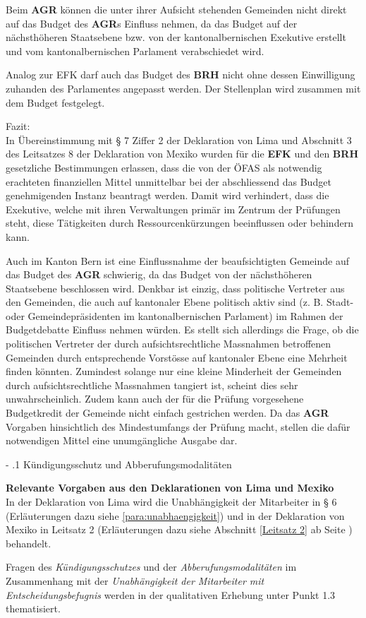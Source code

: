 \documentclass[10pt]{article}
\makeatletter
\renewcommand\paragraph{\@startsection{paragraph}{3}{0mm}{-\baselineskip}{.1\baselineskip}{\normalfont\normalsize\bfseries}}
\renewcommand\paragraph{%
\@startsection{paragraph}{3}{0mm}%
{-\baselineskip}%
{.1\baselineskip}%
{\normalfont\normalsize\bfseries}}
\makeatother
\begin{document}
Beim \textbf{AGR} können die unter ihrer Aufsicht stehenden Gemeinden nicht direkt auf das Budget des \textbf{AGR}s Einfluss nehmen, da das Budget auf der nächsthöheren Staatsebene bzw. von der kantonalbernischen Exekutive erstellt und vom kantonalbernischen Parlament verabschiedet wird.

Analog zur EFK darf auch das Budget des \textbf{BRH} nicht ohne dessen Einwilligung zuhanden des Parlamentes angepasst werden. Der Stellenplan wird zusammen mit dem Budget festgelegt.

Fazit:\\
In Übereinstimmung mit § 7 Ziffer 2 der Deklaration von Lima und Abschnitt 3 des Leitsatzes 8 der Deklaration von Mexiko wurden für die \textbf{EFK} und den \textbf{BRH} gesetzliche Bestimmungen erlassen, dass die von der ÖFAS als notwendig erachteten finanziellen Mittel unmittelbar bei der abschliessend das Budget genehmigenden Instanz beantragt werden. Damit wird verhindert, dass die Exekutive, welche mit ihren Verwaltungen primär im Zentrum der Prüfungen steht, diese Tätigkeiten durch Ressourcenkürzungen beeinflussen oder behindern kann.

Auch im Kanton Bern ist eine Einflussnahme der beaufsichtigten Gemeinde auf das Budget des \textbf{AGR} schwierig, da das Budget von der nächsthöheren Staatsebene beschlossen wird. Denkbar ist einzig, dass politische Vertreter aus den Gemeinden, die auch auf kantonaler Ebene politisch aktiv sind (z. B. Stadt- oder Gemeindepräsidenten im kantonalbernischen Parlament) im Rahmen der Budgetdebatte Einfluss nehmen würden. Es stellt sich allerdings die Frage, ob die politischen Vertreter der durch aufsichtsrechtliche Massnahmen betroffenen Gemeinden durch entsprechende Vorstösse auf kantonaler Ebene eine Mehrheit finden könnten. Zumindest solange nur eine kleine Minderheit der Gemeinden durch aufsichtsrechtliche Massnahmen tangiert ist, scheint dies sehr unwahrscheinlich. Zudem kann auch der für die Prüfung vorgesehene Budgetkredit der Gemeinde nicht einfach gestrichen werden. Da das \textbf{AGR} Vorgaben hinsichtlich des Mindestumfangs der Prüfung macht, stellen die dafür notwendigen Mittel eine unumgängliche Ausgabe dar.

\paragraph{Kündigungsschutz und Abberufungsmodalitäten}\label{para:kuendigungsschutz_und_abberufungsmodalitaeten}
\begin{shaded}
\textbf{Relevante Vorgaben aus den Deklarationen von Lima und Mexiko}\\
In der Deklaration von Lima wird die Unabhängigkeit der Mitarbeiter in § 6 (Erläute­rungen dazu siehe \vref{para:unabhaengigkeit}) und in der Deklaration von Mexiko in Leitsatz 2 (Erläuterungen dazu siehe Abschnitt \ref{Leitsatz 2} ab Seite \pageref{Leitsatz 2}) behandelt.

\end{shaded}
Fragen des \textit{Kündigungsschutzes} und der \textit{Abberufungsmodalitäten} im Zusammenhang mit der \textit{Unabhängigkeit der Mitarbeiter mit Entscheidungsbefugnis} werden in der qualitativen Erhebung unter Punkt 1.3 thematisiert.
\end{document}
